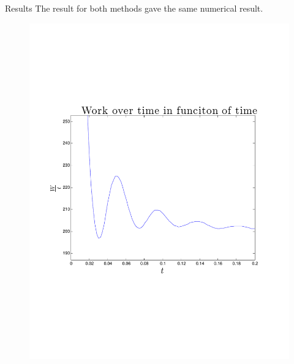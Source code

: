 \begin{frame}{Results}
The result for both methods gave the same numerical result.
  \vspace{0cm}
       
        	  	\begin{minipage}{0.49\textwidth}
        	  	\begin{block}{}
        	  				\vspace{-1.7cm}
        	  	     	  	\begin{figure}
        	  	     	  	      	  \centering
        	  	     	  	      	  \includegraphics[width=\textwidth]{../src/plot/langevin/workOverTimeInFunctionOfTimePotential2.pdf}
        	  	     	  	 \end{figure}
        	  	\end{block}
        	  	\end{minipage}
        	  	\begin{minipage}{0.49\textwidth}
        	  			\begin{block}{}

\end{block}
\end{minipage}
\end{frame}
